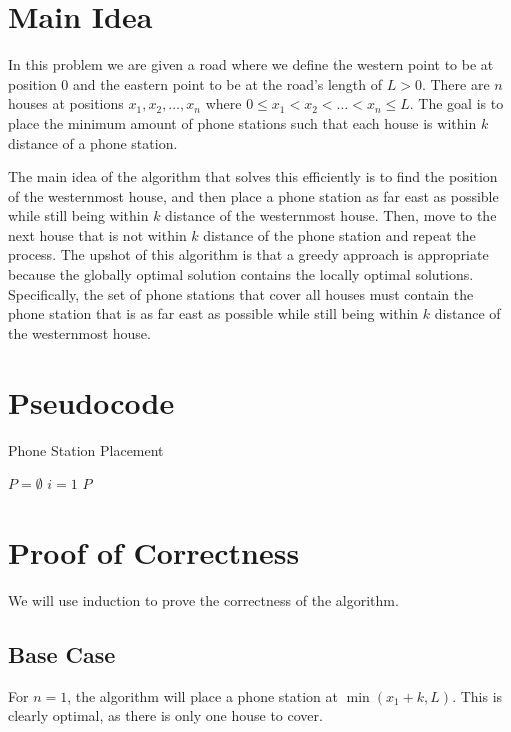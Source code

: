 \documentclass{article}
\begin{document}
\section{Main Idea}

In this problem we are given a road where we define the western point to be at position 0 and the eastern point to be at the road's length of $L > 0$.
There are $n$ houses at positions $x_1, x_2, \ldots, x_n$ where $0 \leq x_1 < x_2 < \ldots < x_n \leq L$.
The goal is to place the minimum amount of phone stations such that each house is within $k$ distance of a phone station.

The main idea of the algorithm that solves this efficiently is to find the position of the westernmost house, and then place a phone station as far east as possible while still being within $k$ distance of the westernmost house.
Then, move to the next house that is not within $k$ distance of the phone station and repeat the process.
The upshot of this algorithm is that a greedy approach is appropriate because the globally optimal solution contains the locally optimal solutions.
Specifically, the set of phone stations that cover all houses must contain the phone station that is as far east as possible while still being within $k$ distance of the westernmost house.

\section{Pseudocode}

\begin{algorithm}[H]
\caption{Phone Station Placement}
\BlankLine
$P = \emptyset$ 
$i = 1$\;
\Return $P$\;
\end{algorithm}

\newpage

\section{Proof of Correctness}

We will use induction to prove the correctness of the algorithm.

\subsection{Base Case}
For $n=1$, the algorithm will place a phone station at $\min(x_1 + k, L)$.
This is clearly optimal, as there is only one house to cover.
\end{document}
